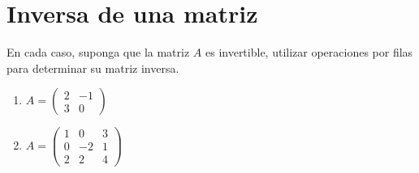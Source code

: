 \documentclass[a4,11pt]{aleph-notas}
\begin{document}
\section{Inversa de una matriz}

\begin{ejer}
    En cada caso, suponga que la matriz $A$ es invertible, utilizar operaciones por filas para determinar su matriz inversa.
    \begin{enumerate}
        \item $A = \begin{pmatrix}
                2 & -1\\ 3 & 0
            \end{pmatrix}$
        \item $A = \begin{pmatrix}
                1 & 0 & 3\\ 0 & -2 &  1 \\ 2 & 2 & 4
            \end{pmatrix}$
    \end{enumerate}
\end{ejer}
\end{document}
